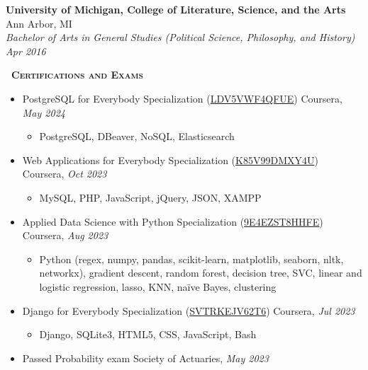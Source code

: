 \documentclass[a4paper,11pt]{article}
\newcommand{\header} [1] {
    \vspace{1mm}
    {\textsc{\textbf{\large{\xrfill[0.5ex]{0.5pt}~#1~\xrfill[0.5ex]{0.5pt}}}}} %
}
\begin{document}
\textbf{University of Michigan, College of Literature, Science, and the Arts} \hfill Ann Arbor, MI\\
\textit{Bachelor of Arts in General Studies (Political Science, Philosophy, and History)} \hfill  \textit{Apr 2016}\\

\vspace{1mm}

\header{Certifications and Exams} \\
\vspace{1mm}
\begin{itemize}
    \item PostgreSQL for Everybody Specialization (\href{https://www.coursera.org/account/accomplishments/specialization/LDV5VWF4QFUE}{LDV5VWF4QFUE}) \hfill Coursera, \textit{May 2024}
    \begin{itemize}
        \item PostgreSQL, DBeaver, NoSQL, Elasticsearch
    \end{itemize}
    \item Web Applications for Everybody Specialization (\href{https://www.coursera.org/account/accomplishments/specialization/K85V99DMXY4U}{K85V99DMXY4U}) \hfill Coursera, \textit{Oct 2023}
    \begin{itemize}
        \item MySQL, PHP, JavaScript, jQuery, JSON, XAMPP
    \end{itemize}
    \item Applied Data Science with Python Specialization (\href{https://www.coursera.org/account/accomplishments/specialization/9E4EZST8HHFE}{9E4EZST8HHFE}) \hfill Coursera, \textit{Aug 2023}
    \begin{itemize}
        \item Python (regex, numpy, pandas, scikit-learn, matplotlib, seaborn, nltk, networkx), gradient descent, random forest, decision tree, SVC, linear and logistic regression, lasso, KNN, na\"{i}ve Bayes, clustering
    \end{itemize}
    \item Django for Everybody Specialization (\href{https://www.coursera.org/account/accomplishments/specialization/SVTRKEJV62T6}{SVTRKEJV62T6}) \hfill Coursera, \textit{Jul 2023}
    \begin{itemize}
        \item Django, SQLite3, HTML5, CSS, JavaScript, Bash
    \end{itemize}
    \item Passed Probability exam \hfill Society of Actuaries, \textit{May 2023}
\end{itemize}
\vspace{1mm}


\end{document}
